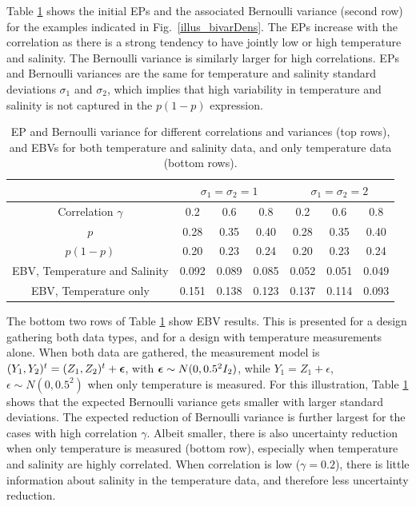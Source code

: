 \documentclass[aoas]{imsart}
\begin{document}
Table \ref{tab:sim_rhoab} shows the initial EPs and the associated
Bernoulli variance (second row) for the examples indicated in
Fig.~\ref{illus_bivarDens}. The EPs increase with the correlation as
there is a strong tendency to have jointly low or high temperature and
salinity. The Bernoulli variance is similarly larger for high
correlations. EPs and Bernoulli variances are the same for temperature
and salinity standard deviations $\sigma_1$ and $\sigma_2$, which
implies that high variability in temperature and salinity is not
captured in the $p(1-p)$ expression.

\begin{table}[!t] \centering \caption{EP and Bernoulli variance for
    different correlations and variances (top rows), and EBVs for both
    temperature and salinity data, and only temperature data (bottom
    rows).}
  \begin{tabular}{c|ccc|ccc}
 &\multicolumn{3}{c}{$\sigma_1=\sigma_2=1$} & \multicolumn{3}{c}{$\sigma_1=\sigma_2=2$} \\
\hline
Correlation $\gamma$ & 0.2 & 0.6 & 0.8 & 0.2 & 0.6 & 0.8 \\
\hline
$p$ & 0.28 & 0.35 & 0.40 & 0.28 & 0.35 & 0.40 \\ 
$p(1-p)$ & 0.20 & 0.23 & 0.24 & 0.20 & 0.23 & 0.24 \\ 
EBV, Temperature and Salinity & 0.092 & 0.089 & 0.085 & 0.052 & 0.051 & 0.049 \\ 
EBV, Temperature only & 0.151 & 0.138 & 0.123 & 0.137 & 0.114 & 0.093 \\ 
\hline
\end{tabular}
\label{tab:sim_rhoab}
\end{table}
The bottom two rows of Table \ref{tab:sim_rhoab} show EBV
results. This is presented for a design gathering both data types, and
for a design with temperature measurements alone. When both data are
gathered, the measurement model is
$(Y_1,Y_2)^t=(Z_1,Z_2)^t+{\boldsymbol \epsilon}$, with
${\boldsymbol \epsilon} \sim N(0,0.5^2I_2)$, while $Y_1=Z_1+\epsilon$,
$\epsilon \sim N(0,0.5^2)$ when only temperature is measured.  For
this illustration, Table \ref{tab:sim_rhoab} shows that the expected
Bernoulli variance gets smaller with larger standard deviations. The
expected reduction of Bernoulli variance is further largest for the
cases with high correlation $\gamma$. Albeit smaller, there is also
uncertainty reduction when only temperature is measured (bottom row),
especially when temperature and salinity are highly correlated. When
correlation is low ($\gamma=0.2$), there is little information about
salinity in the temperature data, and therefore less uncertainty reduction.
\end{document}
